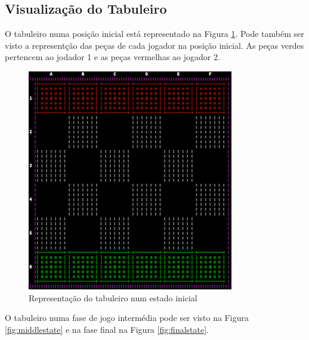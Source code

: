 \documentclass[paper=a4, fontsize=11pt]{scrartcl} %
\numberwithin{equation}{section} %
\numberwithin{figure}{section} %
\numberwithin{table}{section} %
\begin{document}
\subsection{Visualização do Tabuleiro}

O tabuleiro numa posição inicial está representado na Figura \ref{fig:initstate}. Pode também ser visto a representção das peças de cada jogador na posição inicial. As peças verdes pertencem ao jodador 1 e as peças vermelhas ao jogador 2.

\begin{figure}[tb]
	\centering
	\includegraphics{tabuleiro_init}
	\caption[PROLOG: tabuleiro estado inicial]{Representação do tabuleiro num estado inicial} %
	\label{fig:initstate} 
\end{figure}

O tabuleiro numa fase de jogo intermédia pode ser visto na Figura \ref{fig:middlestate} e na fase final na Figura \ref{fig:finalstate}.
\end{document}

